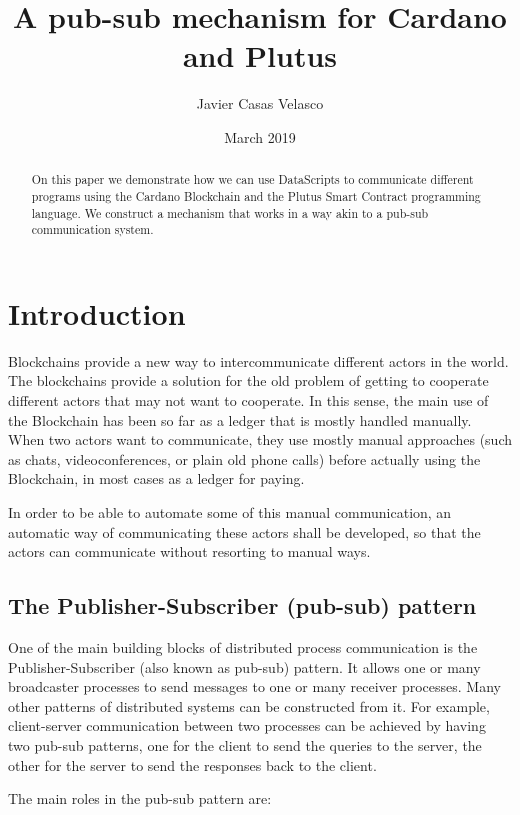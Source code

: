 \documentclass{article}
\begin{document}
\title{A pub-sub mechanism for Cardano and Plutus}
\author{Javier Casas Velasco}
\date{March 2019}
\maketitle

\begin{abstract}
  On this paper we demonstrate how we can use DataScripts to communicate different programs using the Cardano Blockchain and the Plutus Smart Contract programming language. We construct a mechanism that works in a way akin to a pub-sub communication system.
\end{abstract}

\tableofcontents

\section{Introduction}
Blockchains provide a new way to intercommunicate different actors in the world. The blockchains provide a solution for the old problem of getting to cooperate different actors that may not want to cooperate. In this sense, the main use of the Blockchain has been so far as a ledger that is mostly handled manually. When two actors want to communicate, they use mostly manual approaches (such as chats, videoconferences, or plain old phone calls) before actually using the Blockchain, in most cases as a ledger for paying.

In order to be able to automate some of this manual communication, an automatic way of communicating these actors shall be developed, so that the actors can communicate without resorting to manual ways.

\subsection{The Publisher-Subscriber (pub-sub) pattern}

One of the main building blocks of distributed process communication is the Publisher-Subscriber (also known as pub-sub) pattern. It allows one or many broadcaster processes to send messages to one or many receiver processes. Many other patterns of distributed systems can be constructed from it.
For example, client-server communication between two processes can be achieved by having two pub-sub patterns, one for the client to send the queries to the server, the other for the server to send the responses back to the client.

The main roles in the pub-sub pattern are:
\end{document}
